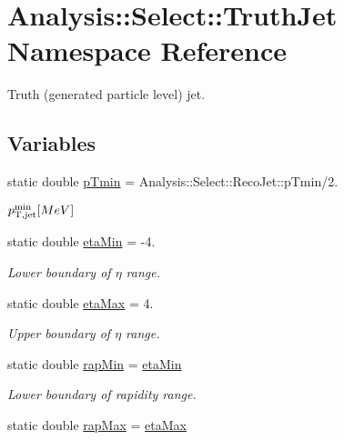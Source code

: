 \hypertarget{namespaceAnalysis_1_1Select_1_1TruthJet}{}\section{Analysis\+:\+:Select\+:\+:Truth\+Jet Namespace Reference}
\label{namespaceAnalysis_1_1Select_1_1TruthJet}


Truth (generated particle level) jet.  


\subsection*{Variables}
\begin{DoxyCompactItemize}
\item 
static double \hyperlink{namespaceAnalysis_1_1Select_1_1TruthJet_a861b3fa8b899e322a5f8a8d04a707220}{p\+Tmin} = Analysis\+::\+Select\+::\+Reco\+Jet\+::p\+Tmin/2.
\begin{DoxyCompactList}\small\item\em $ p_{\rm T,jet}^{\rm min} [MeV] $ \end{DoxyCompactList}\item 
static double \hyperlink{namespaceAnalysis_1_1Select_1_1TruthJet_a37b231bdadb05d096c3542de8387283f}{eta\+Min} = -\/4.
\begin{DoxyCompactList}\small\item\em Lower boundary of $ \eta $ range. \end{DoxyCompactList}\item 
static double \hyperlink{namespaceAnalysis_1_1Select_1_1TruthJet_a667ad09951ba9ba785549ec2e4a10770}{eta\+Max} = 4.
\begin{DoxyCompactList}\small\item\em Upper boundary of $ \eta $ range. \end{DoxyCompactList}\item 
static double \hyperlink{namespaceAnalysis_1_1Select_1_1TruthJet_ac25d5e19383f354b51fb4eec2d0b5d97}{rap\+Min} = \hyperlink{namespaceAnalysis_1_1Select_1_1TruthJet_a37b231bdadb05d096c3542de8387283f}{eta\+Min}
\begin{DoxyCompactList}\small\item\em Lower boundary of rapidity range. \end{DoxyCompactList}\item 
static double \hyperlink{namespaceAnalysis_1_1Select_1_1TruthJet_a1f15c201f6726e1fb1251c65df7204cf}{rap\+Max} = \hyperlink{namespaceAnalysis_1_1Select_1_1TruthJet_a667ad09951ba9ba785549ec2e4a10770}{eta\+Max}

\end{DoxyCompactItemize}
